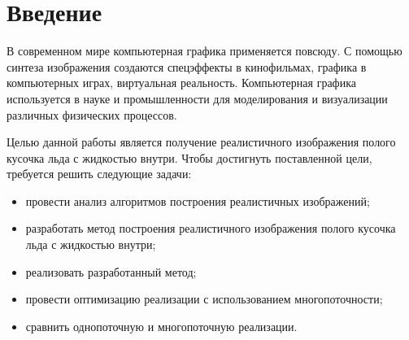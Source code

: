 \chapter*{Введение}

В современном мире компьютерная графика применяется повсюду. С помощью синтеза изображения создаются спецэффекты в кинофильмах, графика в компьютерных играх, виртуальная реальность. Компьютерная графика используется в науке и промышленности для моделирования и визуализации различных физических процессов.

Целью данной работы является получение реалистичного изображения полого кусочка льда с жидкостью внутри.
Чтобы достигнуть поставленной цели, требуется решить следующие задачи:
\begin{itemize}
    \item провести анализ алгоритмов построения реалистичных изображений;
    \item разработать метод построения реалистичного изображения полого кусочка льда с жидкостью внутри;
    \item реализовать разработанный метод;
    \item провести оптимизацию реализации с использованием многопоточности;
    \item сравнить однопоточную и многопоточную реализации.
\end{itemize}
